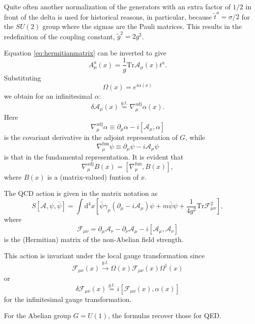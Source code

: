 \par Quite often another normalization of the generators with an extra factor
of $1/2$ in front of the delta is used for historical reasons, in particular,
because $\tilde{t}^a = \sigma/2$ for the $SU(2)$ group where the sigmas are the
Pauli matrices. This results in the redefinition of the coupling constant,
$\tilde{g}^2 = 2g^2$.
\par Equation \eqref{eq:hermitianmatrix} can be inverted to give
\begin{equation}
A_\mu^a(x) = \frac{1}{g}\mathrm{Tr}\mathcal{A}_\mu(x)t^a.
\end{equation}
Substituting
\begin{equation}
  \Omega(x) = e^{i\alpha(x)}
\end{equation}
we obtain for an infinitesimal $\alpha$:
\begin{equation}
  \delta\mathcal{A}_\mu(x)\stackrel{g.t.}{=}
  \nabla_\mu^{\mathrm{adj}}\alpha(x).
\end{equation}
Here
\begin{equation}
  \nabla^{\mathrm{adj}}_\mu\alpha \equiv \partial_\mu\alpha
  - i\left[\mathcal{A}_\mu,\alpha\right]
\end{equation}
is the covariant derivative in the adjoint representation of $G$, while
\begin{equation}
  \nabla^{\mathrm{fun}}_\mu \psi \equiv \partial_\mu\psi
  - i\mathcal{A}_\mu\psi
\end{equation}
is that in the fundamental representation. It is evident that
\begin{equation}
  \nabla_\mu^{\mathrm{adj}}B(x) = \left[\nabla^{\mathrm{fun}}_\mu, B(x)\right],
\end{equation}
where $B(x)$ is a (matrix-valued) funtion of $x$.
\par The QCD action is given in the matrix notation as
\begin{equation}
  S\left[\mathcal{A},\psi,\bar{\psi}\right]
  =\int\mathrm{d}^4x\left[\bar{\psi}\gamma_\mu(\partial_\mu
    - i\mathcal{A}_\mu)\psi + m\bar{\psi}\psi
  + \frac{1}{4g^2}\mathrm{Tr}\mathcal{F}^2_{\mu\nu}\right],
\label{eq:qcdmatrixaction}
\end{equation}
where
\begin{equation}
  \mathcal{F}_{\mu\nu} = \partial_\mu\mathcal{A}_\nu
  - \partial_\nu\mathcal{A}_\mu
  - i\left[\mathcal{A}_\mu,\mathcal{A}_\nu\right]
\end{equation}
is the (Hermitian) matrix of the non-Abelian field strength.
\par This action is invariant under the local gauge transformation since
\begin{equation}
\mathcal{F}_{\mu\nu}(x)\xrightarrow{g.t.}\Omega(x)\mathcal{F}_{\mu\nu}(x)\Omega^\dagger(x)\end{equation}
or
\begin{equation}
  \delta\mathcal{F}_{\mu\nu}(x)\stackrel{g.t.}{=}
  i\left[\mathcal{F}_{\mu\nu}(x),\alpha(x)\right]
\end{equation}
for the infinitesimal gauge transformation.
\par For the Abelian group $G=U(1)$, the formulas recover those for QED.
